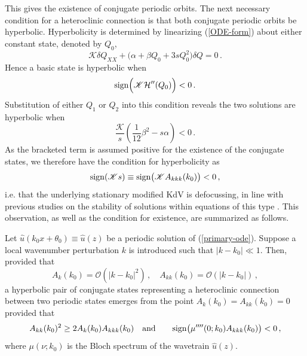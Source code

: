\documentclass[10pt]{article}
\begin{document}
This gives the existence of conjugate periodic orbits. The next necessary condition
for a heteroclinic connection is that both conjugate periodic orbits be
hyperbolic. Hyperbolicity is determined by linearizing (\ref{ODE-form}) about
either constant state, denoted by $Q_0$,
%
\begin{equation}\label{ODE-form-lse}
\mathscr{K} \delta Q_{XX} + \big(\alpha + \beta Q_0 + 3sQ_0^2\big)\delta Q =0\,.
\end{equation}
%
Hence a basic state is hyperbolic when
%
\[
{\rm sign}\Big( \mathscr{K} \mathcal{H}''(Q_0)\Big)<0\,.
\]
%
Substitution of either $Q_{1}$ or $Q_2$ into this condition reveals the two
solutions are hyperbolic when 
\[
\frac{\mathscr{K}}{s}\left(\frac{1}{12}\beta^2-s\alpha\right)<0\,.
\]
%
As the bracketed term is assumed positive for the existence of the conjugate
states, we therefore have the condition for hyperbolicity as
%
\[
{\rm sign}(\mathscr{K}s) \equiv {\rm sign}\big(\mathscr{K}A_{kkk}(k_0)\big)<0\,,
\]
%
i.e. that the underlying stationary modified KdV is defocussing, in line with
previous studies on the stability of solutions within equations of this type
\cite{Bronski2016,Kamchatnov2012,Driscoll1977}. This observation, as well as the
condition for existence, are summarized as follows.

Let $\hat{u}(k_0x+\theta_0) \equiv
    \hat{u}(z)$ be a periodic solution of (\ref{primary-ode}). Suppose a local
    wavenumber perturbation $k$ is introduced such that $|k-k_0|\ll 1$. Then,
    provided that
    \[
    A_k(k_0) = \mathcal{O}(|k-k_0|^2)\,, \quad  A_{kk}(k_0) = \mathcal{O}(|k-k_0|)\,,
    \]
    a hyperbolic pair of conjugate states representing a heteroclinic connection
    between two periodic states emerges from the point $A_k(k_0) = A_{kk}(k_0) =
    0$ provided that
    \[
    A_{kk}(k_0)^2 \geq 2A_k(k_0)A_{kkk}(k_0) \quad {\rm and} \quad \quad {\rm sign}\big(\mu''''(0;k_0)A_{kkk}(k_0)\big)<0\,,
    \]
    where $\mu(\nu;k_0)$ is the Bloch spectrum of the wavetrain $\hat{u}(z)$.
\end{document}
